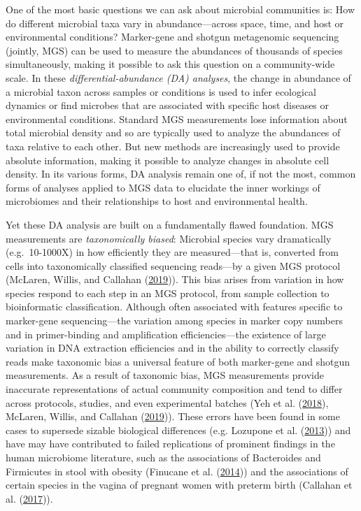 \documentclass[
]{article}
\begin{document}
One of the most basic questions we can ask about microbial communities is: How do different microbial taxa vary in abundance---across space, time, and host or environmental conditions?
Marker-gene and shotgun metagenomic sequencing (jointly, MGS) can be used to measure the abundances of thousands of species simultaneously, making it possible to ask this question on a community-wide scale.
In these \emph{differential-abundance (DA) analyses}, the change in abundance of a microbial taxon across samples or conditions is used to infer ecological dynamics or find microbes that are associated with specific host diseases or environmental conditions.
Standard MGS measurements lose information about total microbial density and so are typically used to analyze the abundances of taxa relative to each other.
But new methods are increasingly used to provide absolute information, making it possible to analyze changes in absolute cell density.
In its various forms, DA analysis remain one of, if not the most, common forms of analyses applied to MGS data to elucidate the inner workings of microbiomes and their relationships to host and environmental health.

Yet these DA analysis are built on a fundamentally flawed foundation.
MGS measurements are \emph{taxonomically biased}: Microbial species vary dramatically (e.g.~10-1000X) in how efficiently they are measured---that is, converted from cells into taxonomically classified sequencing reads---by a given MGS protocol (McLaren, Willis, and Callahan (\protect\hyperlink{ref-mclaren2019cons}{2019})).
This bias arises from variation in how species respond to each step in an MGS protocol, from sample collection to bioinformatic classification.
Although often associated with features specific to marker-gene sequencing---the variation among species in marker copy numbers and in primer-binding and amplification efficiencies---the existence of large variation in DNA extraction efficiencies and in the ability to correctly classify reads make taxonomic bias a universal feature of both marker-gene and shotgun measurements.
As a result of taxonomic bias, MGS measurements provide inaccurate representations of actual community composition and tend to differ across protocols, studies, and even experimental batches (Yeh et al. (\protect\hyperlink{ref-yeh2018taxo}{2018}), McLaren, Willis, and Callahan (\protect\hyperlink{ref-mclaren2019cons}{2019})).
These errors have been found in some cases to supersede sizable biological differences (e.g. Lozupone et al. (\protect\hyperlink{ref-lozupone2013meta}{2013})) and have may have contributed to failed replications of prominent findings in the human microbiome literature, such as the associations of Bacteroides and Firmicutes in stool with obesity (Finucane et al. (\protect\hyperlink{ref-finucane2014atax}{2014})) and the associations of certain species in the vagina of pregnant women with preterm birth (Callahan et al. (\protect\hyperlink{ref-callahan2017repl}{2017})).
\end{document}
